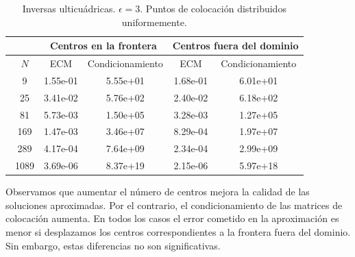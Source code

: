 \documentclass[11pt,a4paper]{article}
\begin{document}
\begin{table}[H]
\centering
\caption{Inversas ulticuádricas. $\epsilon=3$. Puntos de colocación distribuidos uniformemente.}
\begin{tabular}{|c|cc|cc|}
\hline
\ & \multicolumn{2}{|c|}{Centros en la frontera} & \multicolumn{2}{|c|}{Centros fuera del dominio} \\
\hline
\ $N$& ECM & Condicionamiento & ECM & Condicionamiento \\
\hline
\ 9 & 1.55e-01 & 5.55e+01& 1.68e-01 & 6.01e+01 \\
\ 25 &  3.41e-02& 5.76e+02 & 2.40e-02 &6.18e+02  \\
\ 81 & 5.73e-03 & 1.50e+05&  3.28e-03 & 1.27e+05 \\
\ 169 & 1.47e-03 &3.46e+07  & 8.29e-04&1.97e+07  \\
\ 289 &4.17e-04  & 7.64e+09&  2.34e-04&2.99e+09  \\
\ 1089 & 3.69e-06 & 8.37e+19 &   2.15e-06 &5.97e+18  \\
\hline
\end{tabular}
\label{primera comparacion}
\end{table}
Observamos que aumentar el número de centros mejora la calidad de las soluciones aproximadas. Por el contrario, el condicionamiento de las matrices de colocación aumenta. En todos los casos el error cometido en la aproximación es menor si desplazamos los centros correspondientes a la frontera fuera del dominio. Sin embargo, estas diferencias no son significativas. 
\end{document}
